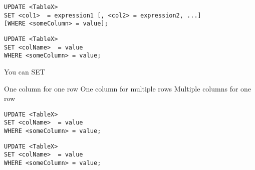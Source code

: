 \documentclass{article}
\begin{document}
  
\begin{lstlisting}[frame=single]  
UPDATE <TableX> 
SET <col1>  = expression1 [, <col2> = expression2, ...]
[WHERE <someColumn> = value];
\end{lstlisting} 


  
  
  
  
  
\begin{lstlisting}[frame=single]  
UPDATE <TableX> 
SET <colName>  = value
WHERE <someColumn> = value;
\end{lstlisting} 


  
  You can SET
  \begin{outline}
  	\1 One column for one row
	\1 One column for multiple rows
	\1 Multiple columns for one row
  \end{outline}
  
  
  
\begin{lstlisting}[frame=single]  
UPDATE <TableX> 
SET <colName>  = value
WHERE <someColumn> = value;
\end{lstlisting} 


  
  
  
\begin{lstlisting}[frame=single]  
UPDATE <TableX> 
SET <colName>  = value
WHERE <someColumn> = value;
\end{lstlisting} 


  
  



 
\end{document}
